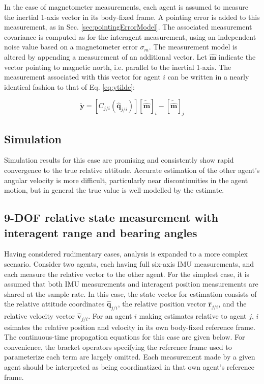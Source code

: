 \documentclass{aiaa-tc}
\newcommand{\br}[2]{[#1]_{#2}} %
\newcommand{\B}[1]{\textbf{#1}} %
\newcommand{\U}[1]{\hat{\textbf{#1}}} %
\begin{document}
In the case of magnetometer measurements, each agent is assumed to measure the inertial 1-axis vector in its body-fixed frame. A pointing error is added to this measurement, as in Sec. \ref{sec:pointingErrorModel}. The associated measurement covariance is computed as for the interagent measurement, using an independent noise value based on a magnetometer error $\sigma_m$. The measurement model is altered by appending a measurement of an additional vector. Let $\U{m}$ indicate the vector pointing to magnetic north, i.e. parallel to the inertial 1-axis. The measurement associated with this vector for agent $i$ can be written in a nearly identical fashion to that of Eq. \ref{eq:ytilde}:

\begin{equation}
\tilde{\B{y}} = [C_{j/i}(\hat{\B{q}}_{j/i})]\br{\tilde{\U{m}}}{i} - \br{\tilde{\U{m}}}{j}
\end{equation}

\subsection{Simulation}

Simulation results for this case are promising and consistently show rapid convergence to the true relative attitude. Accurate estimation of the other agent's angular velocity is more difficult, particularly near discontinuities in the agent motion, but in general the true value is well-modelled by the estimate.

\subsection{9-DOF relative state measurement with interagent range and bearing angles}
\label{sec:9dof_first}

Having considered rudimentary cases, analysis is expanded to a more complex scenario. Consider two agents, each having full six-axis IMU measurements, and each measure the relative vector to the other agent. For the simplest case, it is assumed that both IMU measurements and interagent position measurements are shared at the sample rate. In this case, the state vector for estimation consists of the relative attitude coordinates $\hat{\B{q}}_{j/i}$, the relative position vector $\hat{\B{r}}_{j/i}$, and the relative velocity vector $\hat{\B{v}}_{j/i}$. For an agent $i$ making estimates relative to agent $j$, $i$ esimates the relative position and velocity in its own body-fixed reference frame. The continuous-time propagation equations for this case are given below. For convenience, the bracket operators specifying the reference frame used to parameterize each term are largely omitted. Each measurement made by a given agent should be interpreted as being coordinatized in that own agent's reference frame.
\end{document}

